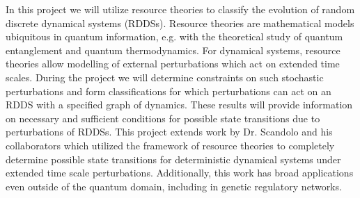 In this project we will utilize resource theories to classify the evolution of random discrete dynamical systems (RDDSs). Resource theories are mathematical models ubiquitous in quantum information, e.g. with the theoretical study of quantum entanglement and quantum thermodynamics. For dynamical systems, resource theories allow modelling of external perturbations which act on extended time scales. During the project we will determine constraints on such stochastic perturbations and form classifications for which perturbations can act on an RDDS with a specified graph of dynamics. These results will provide information on necessary and sufficient conditions for possible state transitions due to perturbations of RDDSs. This project extends work by Dr. Scandolo and his collaborators which utilized the framework of resource theories to completely determine possible state transitions for deterministic dynamical systems under extended time scale perturbations. Additionally, this work has broad applications even outside of the quantum domain, including in genetic regulatory networks.

